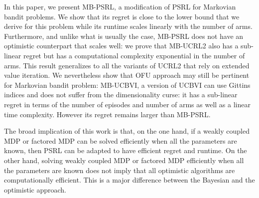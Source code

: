 In this paper, we present MB-PSRL, a modification of PSRL for Markovian bandit problems. We show that its regret is close to the lower bound that we derive for this problem while its runtime scales linearly with the number of arms. Furthermore, and unlike what is usually the case, MB-PSRL does not have an optimistic counterpart that scales well: we prove that  MB-UCRL2 also has a sub-linear regret but has a computational complexity exponential in the number of arms. This result generalizes to all  the variants of UCRL2 that rely on extended value iteration. We nevertheless show that OFU approach may still be pertinent for Markovian bandit problem:  MB-UCBVI, a version of UCBVI can use Gittins indices and  does not suffer from the dimensionality curse: it has a sub-linear regret in terms of the number of episodes and number of arms as well as a linear time complexity. However its regret remains larger than MB-PSRL.

The broad implication of this work is that, on the one hand, if a weakly coupled MDP or factored MDP can be solved efficiently when all the parameters are known, then PSRL can be adapted to have efficient regret and runtime. On the other hand, solving weakly coupled MDP or factored MDP efficiently when all the parameters are known does not imply that all optimistic algorithms are computationally efficient. This is a major difference between the Bayesian and the optimistic approach.

\endgroup
